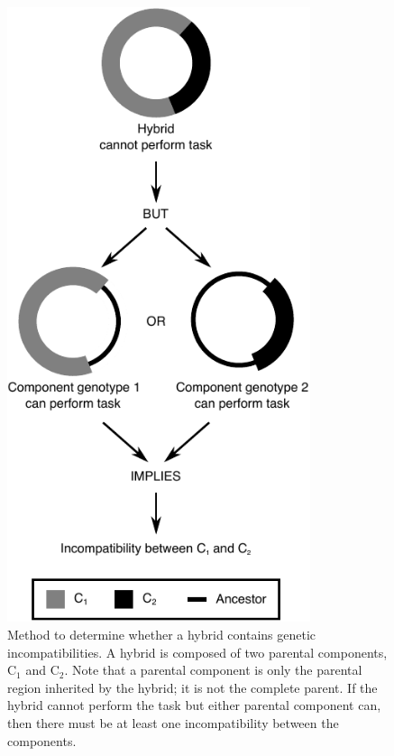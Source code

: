\begin{doublespace}
\begin{figure}
\centering
\includegraphics[width=3.5in]{hybrid_components.pdf}
\caption{Method to determine whether a hybrid contains
  genetic incompatibilities.
  A hybrid is composed of two parental components, C$_{1}$ and C$_{2}$.
  Note that a parental component is only the parental region
  inherited by the hybrid; it is not the complete parent.
  If the hybrid cannot perform the task but either parental component can,
  then there must be at least one incompatibility between the components.}
\label{fig:hybrid_components}
\end{figure}




\end{doublespace}
